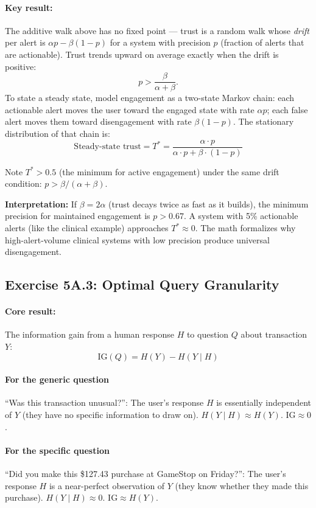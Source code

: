 \paragraph{Key result:} The additive walk above has no fixed point --- trust is a random walk whose \emph{drift} per alert is $\alpha p - \beta (1-p)$ for a system with precision $p$ (fraction of alerts that are actionable). Trust trends upward on average exactly when the drift is positive:
\[
p > \frac{\beta}{\alpha + \beta}.
\]
To state a steady state, model engagement as a two-state Markov chain: each actionable alert moves the user toward the engaged state with rate $\alpha p$; each false alert moves them toward disengagement with rate $\beta (1-p)$. The stationary distribution of that chain is:
\[
\text{Steady-state trust} = T^* = \frac{\alpha \cdot p}{\alpha \cdot p + \beta \cdot (1-p)}
\]

Note $T^* > 0.5$ (the minimum for active engagement) under the same drift condition: $p > \beta / (\alpha + \beta)$.

\textbf{Interpretation:} If $\beta = 2\alpha$ (trust decays twice as fast as it builds), the minimum precision for maintained engagement is $p > 0.67$. A system with 5\% actionable alerts (like the clinical example) approaches $T^* \approx 0$. The math formalizes why high-alert-volume clinical systems with low precision produce universal disengagement.

\subsection{Exercise 5A.3: Optimal Query Granularity}

\paragraph{Core result:} The information gain from a human response $H$ to question $Q$ about transaction $Y$:
\[
\text{IG}(Q) = H(Y) - H(Y \mid H)
\]

\paragraph{For the generic question} ``Was this transaction unusual?'': The user's response $H$ is essentially independent of $Y$ (they have no specific information to draw on). $H(Y \mid H) \approx H(Y)$. $\text{IG} \approx 0$.

\paragraph{For the specific question} ``Did you make this \$127.43 purchase at GameStop on Friday?'': The user's response $H$ is a near-perfect observation of $Y$ (they know whether they made this purchase). $H(Y \mid H) \approx 0$. $\text{IG} \approx H(Y)$.

